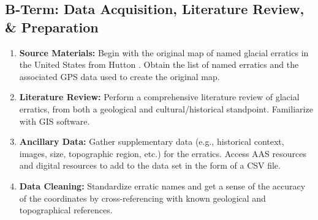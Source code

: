 \documentclass{article}
\begin{document}
\subsection{B-Term: Data Acquisition, Literature Review, \& Preparation}\label{sec:DataAcquisition}
\begin{enumerate}
    \item \textbf{Source Materials:} Begin with the original map of named glacial erratics in the United States from Hutton \cite{Hutton2012}. Obtain the list of named erratics and the associated GPS data used to create the original map.

    \item \textbf{Literature Review:} Perform a comprehensive literature review of glacial erratics, from both a geological and cultural/historical standpoint. Familiarize with GIS software.

    \item \textbf{Ancillary Data:} Gather supplementary data (e.g., historical context, images, size, topographic region, etc.) for the erratics. Access AAS resources and digital resources to add to the data set in the form of a CSV file.

    \item \textbf{Data Cleaning:} Standardize erratic names and get a sense of the accuracy of the coordinates by cross-referencing with known geological and topographical references.
\end{enumerate}
\end{document}
